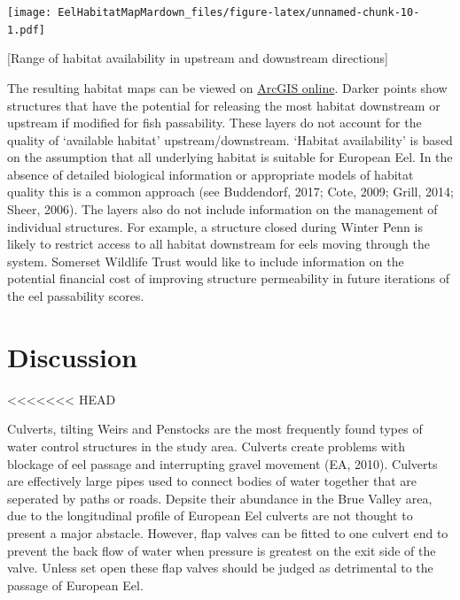 \documentclass[]{article}
\begin{document}
\texttt{[image: EelHabitatMapMardown\_files/figure-latex/unnamed-chunk-10-1.pdf]}

{[}Range of habitat availability in upstream and downstream
directions{]}

The resulting habitat maps can be viewed on
\href{http://arcg.is/8qavW}{ArcGIS online}. Darker points show
structures that have the potential for releasing the most habitat
downstream or upstream if modified for fish passability. These layers do
not account for the quality of `available habitat' upstream/downstream.
`Habitat availability' is based on the assumption that all underlying
habitat is suitable for European Eel. In the absence of detailed
biological information or appropriate models of habitat quality this is
a common approach (see Buddendorf, 2017; Cote, 2009; Grill, 2014; Sheer,
2006). The layers also do not include information on the management of
individual structures. For example, a structure closed during Winter
Penn is likely to restrict access to all habitat downstream for eels
moving through the system. Somerset Wildlife Trust would like to include
information on the potential financial cost of improving structure
permeability in future iterations of the eel passability scores.

\hypertarget{discussion}{%
\section{Discussion}\label{discussion}}

\textless{}\textless{}\textless{}\textless{}\textless{}\textless{}\textless{}
HEAD

Culverts, tilting Weirs and Penstocks are the most frequently found
types of water control structures in the study area. Culverts create
problems with blockage of eel passage and interrupting gravel movement
(EA, 2010). Culverts are effectively large pipes used to connect bodies
of water together that are seperated by paths or roads. Depsite their
abundance in the Brue Valley area, due to the longitudinal profile of
European Eel culverts are not thought to present a major abstacle.
However, flap valves can be fitted to one culvert end to prevent the
back flow of water when pressure is greatest on the exit side of the
valve. Unless set open these flap valves should be judged as detrimental
to the passage of European Eel.
\end{document}
